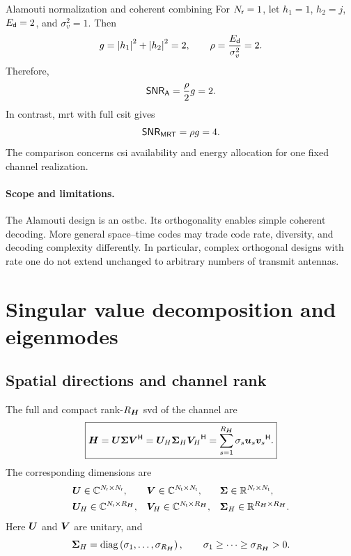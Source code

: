 \begin{example}{Alamouti normalization and coherent combining}
	For $N_{\mathsf{r}} = 1$,  let \(h_1=1\), \(h_2=j\), \(E_{\mathsf{d}}=2\), and \(\sigma_v^2=1\). Then
	\[
	g=\left|h_1\right|^2+\left|h_2\right|^2=2,
	\qquad
	\rho=\frac{E_{\mathsf{d}}}{\sigma_v^2}=2.
	\]
	Therefore,
	\[
	\mathsf{SNR}_{\mathsf A}=\frac{\rho}{2}g=2.
	\]
	In contrast, \ac{mrt} with full \ac{csit} gives
	\[
	\mathsf{SNR}_{\mathsf{MRT}}=\rho g=4.
	\]
	The comparison concerns \ac{csi} availability and energy allocation for one fixed channel realization.
\end{example}


\paragraph{Scope and limitations.}
The Alamouti design is an \ac{ostbc}. Its orthogonality enables simple coherent decoding. More general space--time codes may trade code rate, diversity, and decoding complexity differently. In particular, complex orthogonal designs with rate one do not extend unchanged to arbitrary numbers of transmit antennas.


\section{Singular value decomposition and eigenmodes}\label{sec:svd}

\subsection{Spatial directions and channel rank}

The full and compact rank-$R_{\bm{H}}$ \ac{svd} of the channel are
\begin{equation}\label{eq:svd}
	\boxed{
		\bm{H}
		=\bm{U}\bm{\Sigma}{\bm{V}}^{\mathsf{H}}
		=\bm{U}_{H}\bm{\Sigma}_{H}{\bm{V}_{H}}^{\mathsf{H}}
		=\sum_{s=1}^{R_{\bm{H}}}\sigma_s\bm{u}_s{\bm{v}_s}^{\mathsf{H}}.
	}
\end{equation}
The corresponding dimensions are
\begin{align*}
	&\bm{U}\in\mathbb{C}^{N_{\mathsf{r}}\times N_{\mathsf{r}}},
	&&\bm{V}\in\mathbb{C}^{N_{\mathsf{t}}\times N_{\mathsf{t}}},
	&&\bm{\Sigma}\in\mathbb{R}^{N_{\mathsf{r}}\times N_{\mathsf{t}}},\\
	&\bm{U}_{H}\in\mathbb{C}^{N_{\mathsf{r}}\times R_{\bm{H}}},
	&&\bm{V}_{H}\in\mathbb{C}^{N_{\mathsf{t}}\times R_{\bm{H}}},
	&&\bm{\Sigma}_{H}\in\mathbb{R}^{R_{\bm{H}}\times R_{\bm{H}}}.
\end{align*}
Here $\bm{U}$ and $\bm{V}$ are unitary, and
\[
\bm{\Sigma}_{H}
=\operatorname{diag}\left(\sigma_1,\ldots,\sigma_{R_{\bm{H}}}\right),
\qquad
\sigma_1\geq\cdots\geq\sigma_{R_{\bm{H}}}>0.
\]

